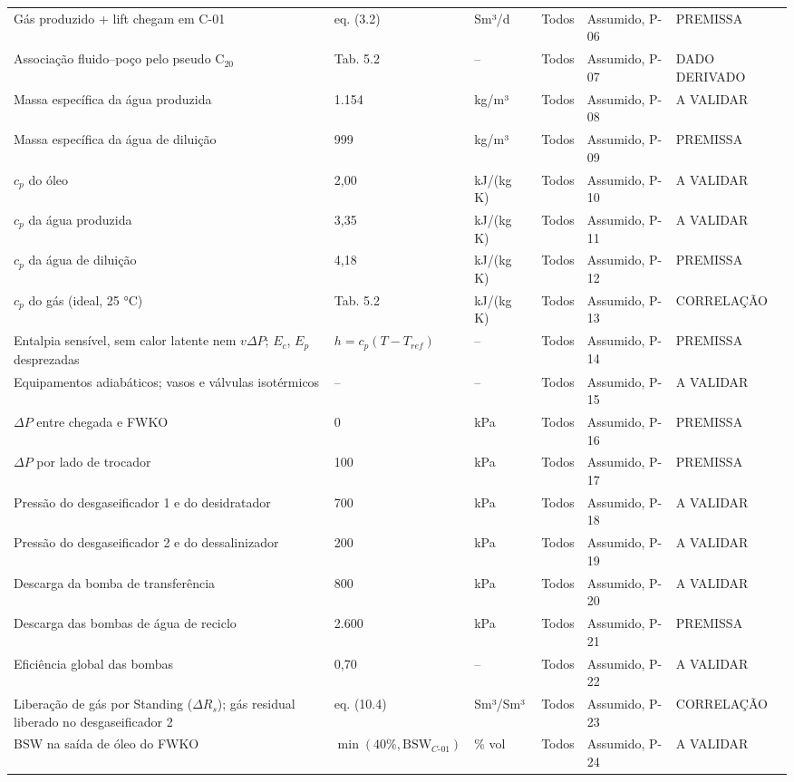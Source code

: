 \documentclass[11pt,a4paper]{article}
\numberwithin{equation}{section}
\numberwithin{table}{section}
\numberwithin{figure}{section}
\newcommand{\tipo}[1]{\textsf{\footnotesize #1}}
\newcommand{\AV}{\textcolor{red!70!black}{\tipo{A VALIDAR}}}
\begin{document}
{\begin{longtable}{L{3.6cm}L{2.2cm}lL{1.0cm}L{4.2cm}l}
Gás produzido + lift chegam em C-01 & eq. (3.2) & Sm³/d & Todos & Assumido, P-06 & \tipo{PREMISSA}\\
Associação fluido--poço pelo pseudo C$_{20}$ & Tab. 5.2 & -- & Todos & Assumido, P-07 & \tipo{DADO DERIVADO}\\
Massa específica da água produzida & 1.154 & kg/m³ & Todos & Assumido, P-08 & \AV\\
Massa específica da água de diluição & 999 & kg/m³ & Todos & Assumido, P-09 & \tipo{PREMISSA}\\
$c_p$ do óleo & 2{,}00 & kJ/(kg K) & Todos & Assumido, P-10 & \AV\\
$c_p$ da água produzida & 3{,}35 & kJ/(kg K) & Todos & Assumido, P-11 & \AV\\
$c_p$ da água de diluição & 4{,}18 & kJ/(kg K) & Todos & Assumido, P-12 & \tipo{PREMISSA}\\
$c_p$ do gás (ideal, 25 °C) & Tab. 5.2 & kJ/(kg K) & Todos & Assumido, P-13 & \tipo{CORRELAÇÃO}\\
Entalpia sensível, sem calor latente nem $v\Delta P$; $E_c$, $E_p$ desprezadas & $h=c_p(T-T_{ref})$ & -- & Todos & Assumido, P-14 & \tipo{PREMISSA}\\
Equipamentos adiabáticos; vasos e válvulas isotérmicos & -- & -- & Todos & Assumido, P-15 & \AV\\
$\Delta P$ entre chegada e FWKO & 0 & kPa & Todos & Assumido, P-16 & \tipo{PREMISSA}\\
$\Delta P$ por lado de trocador & 100 & kPa & Todos & Assumido, P-17 & \tipo{PREMISSA}\\
Pressão do desgaseificador 1 e do desidratador & 700 & kPa & Todos & Assumido, P-18 & \AV\\
Pressão do desgaseificador 2 e do dessalinizador & 200 & kPa & Todos & Assumido, P-19 & \AV\\
Descarga da bomba de transferência & 800 & kPa & Todos & Assumido, P-20 & \AV\\
Descarga das bombas de água de reciclo & 2.600 & kPa & Todos & Assumido, P-21 & \tipo{PREMISSA}\\
Eficiência global das bombas & 0{,}70 & -- & Todos & Assumido, P-22 & \AV\\
Liberação de gás por Standing ($\Delta R_s$); gás residual liberado no desgaseificador 2 & eq. (10.4) & Sm³/Sm³ & Todos & Assumido, P-23 & \tipo{CORRELAÇÃO}\\
BSW na saída de óleo do FWKO & $\min(40\%,\mathrm{BSW}_{C\text{-}01})$ & \% vol & Todos & Assumido, P-24 & \AV\\

\end{longtable}}
\end{document}
